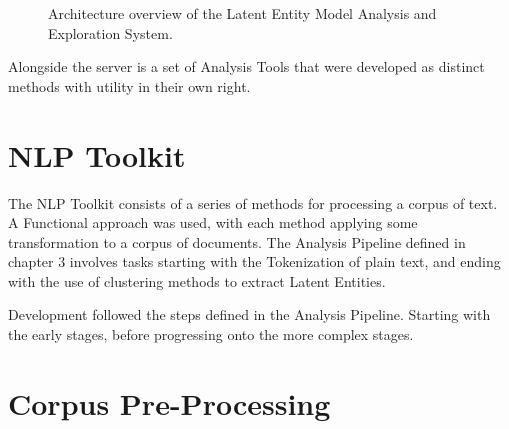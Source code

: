 \documentclass[10pt]{report}
\begin{document}
\begin{figure}[h!]

  
  \caption{Architecture overview of the Latent Entity Model Analysis and Exploration System. \label{fig:architeture_overview}}
\end{figure}


Alongside the server is a set of Analysis Tools that were developed as distinct methods with utility in their own right.

\section{NLP Toolkit}
The NLP Toolkit consists of a series of methods for processing a corpus of text. A Functional approach was used, with each method applying some transformation to a corpus of documents. The Analysis Pipeline defined in chapter 3 involves tasks starting with the Tokenization of plain text, and ending with the use of clustering methods to extract Latent Entities.

Development followed the steps defined in the Analysis Pipeline. Starting with the early stages, before progressing onto the more complex stages.

\section{Corpus Pre-Processing}
\end{document}
